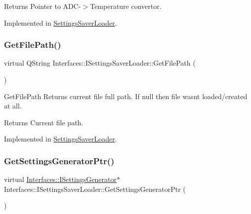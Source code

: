 \begin{DoxyReturn}{Returns}
Pointer to A\+D\+C-\/$>$Temperature convertor. 
\end{DoxyReturn}


Implemented in \hyperlink{class_settings_saver_loader_aa1265b1e9431bf3b611e5b45b4782700}{Settings\+Saver\+Loader}.

\mbox{\label{class_interfaces_1_1_i_settings_saver_loader_a7224c9ffc2d9c6a3b98fb20246e97cc3}} 
\subsubsection{\texorpdfstring{Get\+File\+Path()}{GetFilePath()}}
{\footnotesize\ttfamily virtual Q\+String Interfaces\+::\+I\+Settings\+Saver\+Loader\+::\+Get\+File\+Path (\begin{DoxyParamCaption}{ }\end{DoxyParamCaption})\hspace{0.3cm}{\ttfamily [pure virtual]}}



Get\+File\+Path Returns current file full path. If null then file wasn\textquotesingle{}t loaded/created at all. 

\begin{DoxyReturn}{Returns}
Current file path. 
\end{DoxyReturn}


Implemented in \hyperlink{class_settings_saver_loader_a006a6350a00ffc18ec544616e504ccf7}{Settings\+Saver\+Loader}.

\mbox{\label{class_interfaces_1_1_i_settings_saver_loader_a73c8012dc63ca02d65a013ca901840ba}} 
\subsubsection{\texorpdfstring{Get\+Settings\+Generator\+Ptr()}{GetSettingsGeneratorPtr()}}
{\footnotesize\ttfamily virtual \hyperlink{class_interfaces_1_1_i_settings_generator}{Interfaces\+::\+I\+Settings\+Generator}$\ast$ Interfaces\+::\+I\+Settings\+Saver\+Loader\+::\+Get\+Settings\+Generator\+Ptr (\begin{DoxyParamCaption}{ }\end{DoxyParamCaption})\hspace{0.3cm}{\ttfamily [pure virtual]}}



